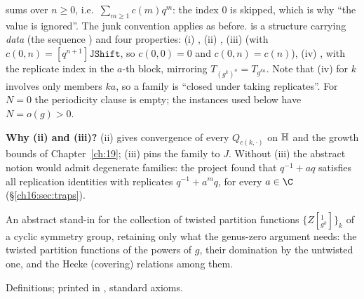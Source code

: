 \begin{dictionary}
 sums  over $n\ge0$, i.e.\ $\sum_{m\ge1}c(m)q^m$: the index $0$ is
skipped, which is why ``the value  is ignored''.  The  junk convention applies as before.
 is a structure carrying \emph{data} (the sequence ) and four properties: (i)
, (ii) , (iii)  (with $c(0,n)=[q^{n+1}]\mathtt{JShift}$, so $c(0,0)=0$ and
$c(0,n)=c(n)$), (iv) , with the replicate index  in the $a$-th block, mirroring
$T_{(g^k)^a}=T_{g^{ka}}$.  Note that (iv) for $k$ involves only members $ka$, so a family is ``closed under taking
replicates''.  For $N=0$ the periodicity clause is empty; the instances used below have $N=o(g)>0$.

\textbf{Why (ii) and (iii)?}  (ii) gives convergence of every $Q_{c(k,\cdot)}$ on $\mathbb{H}$ and the growth bounds of
Chapter~\ref{ch:19}; (iii) pins the family to $J$.  Without (iii) the abstract notion would admit degenerate
families: the project found that $q^{-1}+aq$ satisfies all replication identities with replicates $q^{-1}+a^mq$, for
every $a\in\C$ (\S\ref{ch16:sec:traps}).
\end{dictionary}
\begin{physics}
An abstract stand-in for the collection of twisted partition functions $\{Z[{}^1_{g^k}]\}_k$ of a cyclic symmetry
group, retaining only what the genus-zero argument needs: the twisted partition functions of the powers of $g$, their
domination by the untwisted one, and the Hecke (covering) relations among them.
\end{physics}
\begin{status}
Definitions; printed in , standard axioms.
\end{status}

